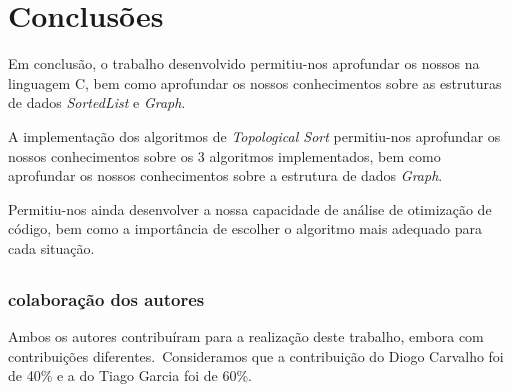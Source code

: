 
\chapter{Conclusões}
\label{ch:conclusoes}

Em conclusão, o trabalho desenvolvido permitiu-nos aprofundar os nossos na linguagem C, bem como aprofundar os nossos conhecimentos sobre as estruturas de dados \textit{SortedList} e \textit{Graph}.

A implementação dos algoritmos de \textit{Topological Sort} permitiu-nos aprofundar os nossos conhecimentos sobre os 3 algoritmos implementados, bem como aprofundar os nossos conhecimentos sobre a estrutura de dados \textit{Graph}.

Permitiu-nos ainda desenvolver a nossa capacidade de análise de otimização de código, bem como a importância de escolher o algoritmo mais adequado para cada situação.

\section*{}
\subsection*{colaboração dos autores}
\label{subsec:conclusoes:colaboracao-dos-autores}

Ambos os autores contribuíram para a realização deste trabalho, embora com contribuições diferentes.\ Consideramos que a contribuição do Diogo Carvalho foi de 40\% e a do Tiago Garcia foi de 60\%.

